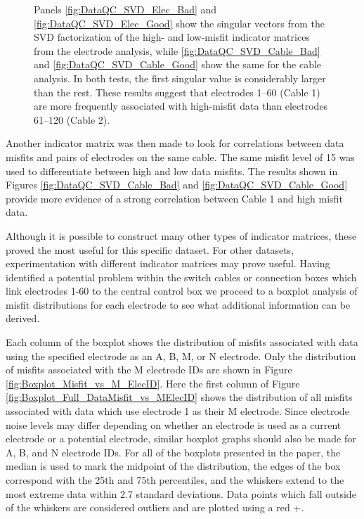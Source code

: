 \documentclass[final,authoryear,5p,times,twocolumn]{elsarticle}
\begin{document}
\begin{figure}[!ht]
   \caption{Panels \ref{fig:DataQC_SVD_Elec_Bad} and \ref{fig:DataQC_SVD_Elec_Good} show the singular vectors from the SVD factorization of the high- and low-misfit indicator matrices from the electrode analysis, while \ref{fig:DataQC_SVD_Cable_Bad} and \ref{fig:DataQC_SVD_Cable_Good} show the same for the cable analysis. In both tests, the first singular value is considerably larger than the rest. These results suggest that electrodes 1--60 (Cable 1) are more frequently associated with high-misfit data than electrodes 61--120 (Cable 2).}
   \label{fig:DataQC_SVD_ElecCable}
\end{figure}



Another indicator matrix was then made to look for correlations between data misfits and pairs of electrodes on the same cable. The same misfit level of 15 was used to differentiate between high and low data misfits. The results shown in Figures \ref{fig:DataQC_SVD_Cable_Bad} and \ref{fig:DataQC_SVD_Cable_Good} provide more evidence of a strong correlation between Cable 1 and high misfit data.

Although it is possible to construct many other types of indicator matrices, these proved the most useful for this specific dataset. For other datasets, experimentation with different indicator matrices may prove useful. Having identified a potential problem within the switch cables or connection boxes which link electrodes 1-60 to the central control box we proceed to a boxplot analysis of misfit distributions for each electrode to see what additional information can be derived.

Each column of the boxplot shows the distribution of misfits associated with data using the specified electrode as an A, B, M, or N electrode. Only the distribution of misfits associated with the M electrode IDs are shown in Figure \ref{fig:Boxplot_Misfit_vs_M_ElecID}. Here the first column of Figure \ref{fig:Boxplot_Full_DataMisfit_vs_MElecID} shows the distribution of all misfits associated with data which use electrode 1 as their M electrode. Since electrode noise levels may differ depending on whether an electrode is used as a current electrode or a potential electrode, similar boxplot graphs should also be made for A, B, and N electrode IDs. For all of the boxplots presented in the paper, the median is used to mark the midpoint of the distribution, the edges of the box correspond with the 25th and 75th percentiles, and the whiskers extend to the most extreme data within 2.7 standard deviations. Data points which fall outside of the whiskers are considered outliers and are plotted using a red +.
\end{document}
